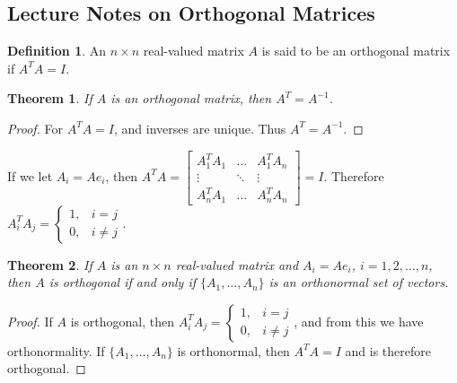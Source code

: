 \documentclass[oneside]{book}
\newtheorem{theorem}{Theorem}[section]
\theoremstyle{definition}
\newtheorem{definition}{Definition}[section]
\begin{document}
\subsection{Lecture Notes on Orthogonal Matrices}

\begin{definition}
An $n\times n$ real-valued matrix $A$ is said to be an orthogonal matrix if $A^TA = I$.
\end{definition}

\begin{theorem}
If $A$ is an orthogonal matrix, then $A^T = A^{-1}$.
\end{theorem}
\begin{proof}
For $A^TA = I$, and inverses are unique. Thus $A^T = A^{-1}$.
\end{proof}

If we let $A_{i} = Ae_{i}$, then $A^TA = \begin{bmatrix} A_1^TA_1 & \hdots & A_1^TA_n \\ \vdots & \ddots & \vdots \\ A_n^TA_1 & \hdots & A_n^TA_n\end{bmatrix} = I$. Therefore $A_i^TA_j = \begin{cases} 1, & i=j \\ 0, & i\ne j\end{cases}$.

\begin{theorem}
If $A$ is an $n\times n$ real-valued matrix and $A_i = Ae_i$, $i=1,2,\hdots, n$, then $A$ is orthogonal if and only if $\{A_1,\hdots, A_n\}$ is an orthonormal set of vectors.
\end{theorem}
\begin{proof}
If $A$ is orthogonal, then $A_i^TA_j = \begin{cases} 1, & i=j \\ 0, & i\ne j\end{cases}$, and from this we have orthonormality. If $\{A_1,\hdots, A_n\}$ is orthonormal, then $A^TA = I$ and is therefore orthogonal.
\end{proof}
\end{document}
